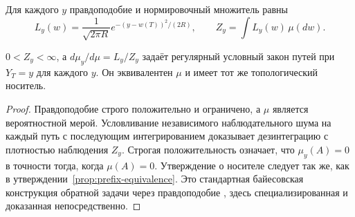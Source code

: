 \subsection{}
{Для каждого $y$ правдоподобие и нормировочный множитель равны}
\[
L_y(w)=\frac{1}{\sqrt{2\pi R}}e^{-(y-w(T))^2/(2R)},
\qquad Z_y=\int L_y(w)\,\mu(dw).
\]
\begin{proposition}
\label{prop:noisy-equivalence}
{$0<Z_y<\infty$, а $d\mu_y/d\mu=L_y/Z_y$ задаёт регулярный условный закон путей при $Y_T=y$ для каждого $y$. Он эквивалентен $\mu$ и имеет тот же топологический носитель.}
\end{proposition}
\begin{proof}
{Правдоподобие строго положительно и ограничено, а $\mu$ является вероятностной мерой. Условливание независимого наблюдательного шума на каждый путь с последующим интегрированием доказывает дезинтеграцию с плотностью наблюдения $Z_y$. Строгая положительность означает, что $\mu_y(A)=0$ в точности тогда, когда $\mu(A)=0$. Утверждение о носителе следует так же, как в утверждении~\ref{prop:prefix-equivalence}. Это стандартная байесовская конструкция обратной задачи через правдоподобие \cite[Section 2 and Theorem 6.31]{Stuart2010}, здесь специализированная и доказанная непосредственно.}
\end{proof}

